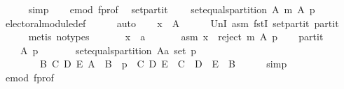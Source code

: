 \begin{isabellebody}
\ \ \ \ \isamarkupfalse%
\ simp\isanewline
\ \ \isamarkupfalse%
\ e{\isacharunderscore}{\kern0pt}mod\ f{\isacharunderscore}{\kern0pt}prof\ \isamarkupfalse%
\ set{\isacharunderscore}{\kern0pt}partit{\isacharcolon}{\kern0pt}\isanewline
\ \ \ \ {\isachardoublequoteopen}set{\isacharunderscore}{\kern0pt}equals{\isacharunderscore}{\kern0pt}partition\ A\ {\isacharparenleft}{\kern0pt}m\ A\ p{\isacharparenright}{\kern0pt}{\isachardoublequoteclose}\isanewline
\ \ \ \ \isamarkupfalse%
\ electoral{\isacharunderscore}{\kern0pt}module{\isacharunderscore}{\kern0pt}def\isanewline
\ \ \ \ \isamarkupfalse%
\ auto\isanewline
\ \ \isamarkupfalse%
\ {\isachardoublequoteopen}x\ {\isasymin}\ A{\isachardoublequoteclose}\isanewline
\ \ \ \ \isamarkupfalse%
\ UnI{}\ asm\ fstI\ set{\isacharunderscore}{\kern0pt}partit\ partit\isanewline
\ \ \ \ \isamarkupfalse%
\ {\isacharparenleft}{\kern0pt}metis\ {\isacharparenleft}{\kern0pt}no{\isacharunderscore}{\kern0pt}types{\isacharparenright}{\kern0pt}{\isacharparenright}{\kern0pt}\isanewline
{}\isamarkupfalse%
\isanewline
\ \ \isamarkupfalse%
\isanewline
\ \ \ \ x\ {\isacharcolon}{\kern0pt}{\isacharcolon}{\kern0pt}\ {\isachardoublequoteopen}{\isacharprime}{\kern0pt}a{\isachardoublequoteclose}\isanewline
\ \ \isamarkupfalse%
\isanewline
\ \ \ \ asm{\isacharcolon}{\kern0pt}\ {\isachardoublequoteopen}x\ {\isasymin}\ reject\ m\ A\ p{\isachardoublequoteclose}\isanewline
\ \ \isamarkupfalse%
\ partit{\isacharcolon}{\kern0pt}\isanewline
\ \ \ \ {\isachardoublequoteopen}{\isasymforall}A\ p{\isachardot}{\kern0pt}\isanewline
\ \ \ \ \ \ {\isasymnot}\ set{\isacharunderscore}{\kern0pt}equals{\isacharunderscore}{\kern0pt}partition\ {\isacharparenleft}{\kern0pt}A{\isacharcolon}{\kern0pt}{\isacharcolon}{\kern0pt}{\isacharprime}{\kern0pt}a\ set{\isacharparenright}{\kern0pt}\ p\ {\isasymor}\isanewline
\ \ \ \ \ \ \ \ {\isacharparenleft}{\kern0pt}{\isasymexists}B\ C\ D\ E{\isachardot}{\kern0pt}\ A\ {\isacharequal}{\kern0pt}\ B\ {\isasymand}\ p\ {\isacharequal}{\kern0pt}\ {\isacharparenleft}{\kern0pt}C{\isacharcomma}{\kern0pt}\ D{\isacharcomma}{\kern0pt}\ E{\isacharparenright}{\kern0pt}\ {\isasymand}\ C\ {\isasymunion}\ D\ {\isasymunion}\ E\ {\isacharequal}{\kern0pt}\ B{\isacharparenright}{\kern0pt}{\isachardoublequoteclose}\isanewline
\ \ \ \ \isamarkupfalse%
\ simp\isanewline
\ \ \isamarkupfalse%
\ e{\isacharunderscore}{\kern0pt}mod\ f{\isacharunderscore}{\kern0pt}prof\ \isamarkupfalse%

\end{isabellebody}
